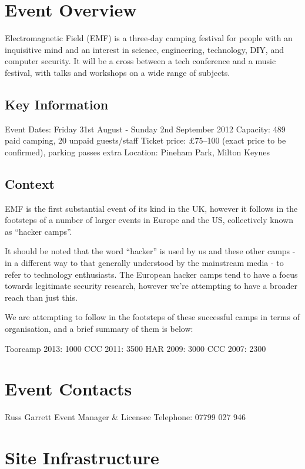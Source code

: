 \section{Event Overview}

Electromagnetic Field (EMF) is a three-day camping festival for people
with an inquisitive mind and an interest in science, engineering,
technology, DIY, and computer security. It will be a cross between a
tech conference and a music festival, with talks and workshops on a wide
range of subjects.

\subsection{Key Information}

Event Dates: Friday 31st August - Sunday 2nd September 2012 Capacity:
489 paid camping, 20 unpaid guests/staff Ticket price: £75--100 (exact
price to be confirmed), parking passes extra Location: Pineham Park,
Milton Keynes

\subsection{Context}

EMF is the first substantial event of its kind in the UK, however it
follows in the footsteps of a number of larger events in Europe and the
US, collectively known as ``hacker camps''.

It should be noted that the word ``hacker'' is used by us and these
other camps - in a different way to that generally understood by the
mainstream media - to refer to technology enthusiasts. The European
hacker camps tend to have a focus towards legitimate security research,
however we're attempting to have a broader reach than just this.

We are attempting to follow in the footsteps of these successful camps
in terms of organisation, and a brief summary of them is below:

Toorcamp 2013: 1000 CCC 2011: 3500 HAR 2009: 3000 CCC 2007: 2300

\section{Event Contacts}

Russ Garrett Event Manager \& Licensee Telephone: 07799 027 946

\section{Site Infrastructure}

